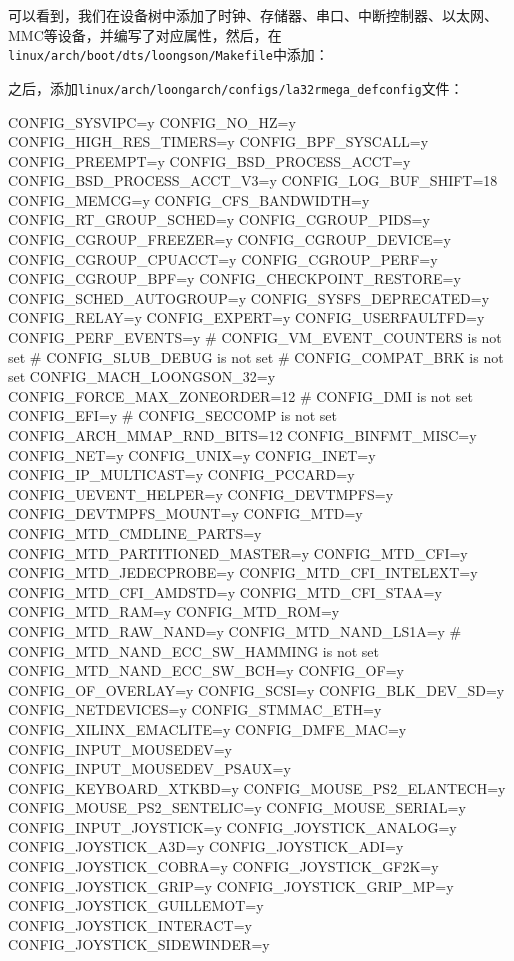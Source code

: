 可以看到，我们在设备树中添加了时钟、存储器、串口、中断控制器、以太网、MMC等设备，并编写了对应属性，然后，在\texttt{linux/arch/boot/dts/loongson/Makefile}中添加：


之后，添加\texttt{linux/arch/loongarch/configs/la32rmega\_defconfig}文件：

\begin{CodeBlock}[language=BookConfig]
CONFIG_SYSVIPC=y
CONFIG_NO_HZ=y
CONFIG_HIGH_RES_TIMERS=y
CONFIG_BPF_SYSCALL=y
CONFIG_PREEMPT=y
CONFIG_BSD_PROCESS_ACCT=y
CONFIG_BSD_PROCESS_ACCT_V3=y
CONFIG_LOG_BUF_SHIFT=18
CONFIG_MEMCG=y
CONFIG_CFS_BANDWIDTH=y
CONFIG_RT_GROUP_SCHED=y
CONFIG_CGROUP_PIDS=y
CONFIG_CGROUP_FREEZER=y
CONFIG_CGROUP_DEVICE=y
CONFIG_CGROUP_CPUACCT=y
CONFIG_CGROUP_PERF=y
CONFIG_CGROUP_BPF=y
CONFIG_CHECKPOINT_RESTORE=y
CONFIG_SCHED_AUTOGROUP=y
CONFIG_SYSFS_DEPRECATED=y
CONFIG_RELAY=y
CONFIG_EXPERT=y
CONFIG_USERFAULTFD=y
CONFIG_PERF_EVENTS=y
# CONFIG_VM_EVENT_COUNTERS is not set
# CONFIG_SLUB_DEBUG is not set
# CONFIG_COMPAT_BRK is not set
CONFIG_MACH_LOONGSON_32=y
CONFIG_FORCE_MAX_ZONEORDER=12
# CONFIG_DMI is not set
CONFIG_EFI=y
# CONFIG_SECCOMP is not set
CONFIG_ARCH_MMAP_RND_BITS=12
CONFIG_BINFMT_MISC=y
CONFIG_NET=y
CONFIG_UNIX=y
CONFIG_INET=y
CONFIG_IP_MULTICAST=y
CONFIG_PCCARD=y
CONFIG_UEVENT_HELPER=y
CONFIG_DEVTMPFS=y
CONFIG_DEVTMPFS_MOUNT=y
CONFIG_MTD=y
CONFIG_MTD_CMDLINE_PARTS=y
CONFIG_MTD_PARTITIONED_MASTER=y
CONFIG_MTD_CFI=y
CONFIG_MTD_JEDECPROBE=y
CONFIG_MTD_CFI_INTELEXT=y
CONFIG_MTD_CFI_AMDSTD=y
CONFIG_MTD_CFI_STAA=y
CONFIG_MTD_RAM=y
CONFIG_MTD_ROM=y
CONFIG_MTD_RAW_NAND=y
CONFIG_MTD_NAND_LS1A=y
# CONFIG_MTD_NAND_ECC_SW_HAMMING is not set
CONFIG_MTD_NAND_ECC_SW_BCH=y
CONFIG_OF=y
CONFIG_OF_OVERLAY=y
CONFIG_SCSI=y
CONFIG_BLK_DEV_SD=y
CONFIG_NETDEVICES=y
CONFIG_STMMAC_ETH=y
CONFIG_XILINX_EMACLITE=y
CONFIG_DMFE_MAC=y
CONFIG_INPUT_MOUSEDEV=y
CONFIG_INPUT_MOUSEDEV_PSAUX=y
CONFIG_KEYBOARD_XTKBD=y
CONFIG_MOUSE_PS2_ELANTECH=y
CONFIG_MOUSE_PS2_SENTELIC=y
CONFIG_MOUSE_SERIAL=y
CONFIG_INPUT_JOYSTICK=y
CONFIG_JOYSTICK_ANALOG=y
CONFIG_JOYSTICK_A3D=y
CONFIG_JOYSTICK_ADI=y
CONFIG_JOYSTICK_COBRA=y
CONFIG_JOYSTICK_GF2K=y
CONFIG_JOYSTICK_GRIP=y
CONFIG_JOYSTICK_GRIP_MP=y
CONFIG_JOYSTICK_GUILLEMOT=y
CONFIG_JOYSTICK_INTERACT=y
CONFIG_JOYSTICK_SIDEWINDER=y

\end{CodeBlock}

